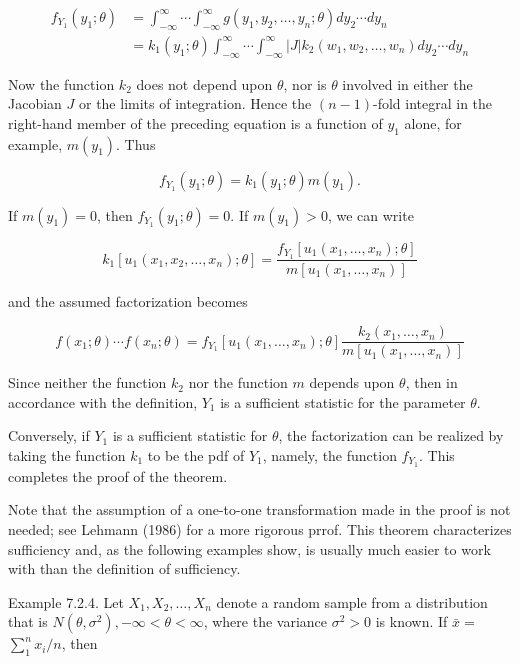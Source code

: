 $$
\begin{aligned}
f_{Y_{1}}\left(y_{1} ; \theta\right) & =\int_{-\infty}^{\infty} \cdots \int_{-\infty}^{\infty} g\left(y_{1}, y_{2}, \ldots, y_{n} ; \theta\right) d y_{2} \cdots d y_{n} \\
& =k_{1}\left(y_{1} ; \theta\right) \int_{-\infty}^{\infty} \cdots \int_{-\infty}^{\infty}|J| k_{2}\left(w_{1}, w_{2}, \ldots, w_{n}\right) d y_{2} \cdots d y_{n}
\end{aligned}
$$

Now the function $k_{2}$ does not depend upon $\theta$, nor is $\theta$ involved in either the Jacobian $J$ or the limits of integration. Hence the $(n-1)$-fold integral in the right-hand member of the preceding equation is a function of $y_{1}$ alone, for example, $m\left(y_{1}\right)$. Thus

$$
f_{Y_{1}}\left(y_{1} ; \theta\right)=k_{1}\left(y_{1} ; \theta\right) m\left(y_{1}\right) .
$$

If $m\left(y_{1}\right)=0$, then $f_{Y_{1}}\left(y_{1} ; \theta\right)=0$. If $m\left(y_{1}\right)>0$, we can write

$$
k_{1}\left[u_{1}\left(x_{1}, x_{2}, \ldots, x_{n}\right) ; \theta\right]=\frac{f_{Y_{1}}\left[u_{1}\left(x_{1}, \ldots, x_{n}\right) ; \theta\right]}{m\left[u_{1}\left(x_{1}, \ldots, x_{n}\right)\right]}
$$

and the assumed factorization becomes

$$
f\left(x_{1} ; \theta\right) \cdots f\left(x_{n} ; \theta\right)=f_{Y_{1}}\left[u_{1}\left(x_{1}, \ldots, x_{n}\right) ; \theta\right] \frac{k_{2}\left(x_{1}, \ldots, x_{n}\right)}{m\left[u_{1}\left(x_{1}, \ldots, x_{n}\right)\right]}
$$

Since neither the function $k_{2}$ nor the function $m$ depends upon $\theta$, then in accordance with the definition, $Y_{1}$ is a sufficient statistic for the parameter $\theta$.

Conversely, if $Y_{1}$ is a sufficient statistic for $\theta$, the factorization can be realized by taking the function $k_{1}$ to be the pdf of $Y_{1}$, namely, the function $f_{Y_{1}}$. This completes the proof of the theorem.

Note that the assumption of a one-to-one transformation made in the proof is not needed; see Lehmann (1986) for a more rigorous prrof. This theorem characterizes sufficiency and, as the following examples show, is usually much easier to work with than the definition of sufficiency.

Example 7.2.4. Let $X_{1}, X_{2}, \ldots, X_{n}$ denote a random sample from a distribution that is $N\left(\theta, \sigma^{2}\right),-\infty<\theta<\infty$, where the variance $\sigma^{2}>0$ is known. If $\bar{x}=$ $\sum_{1}^{n} x_{i} / n$, then

